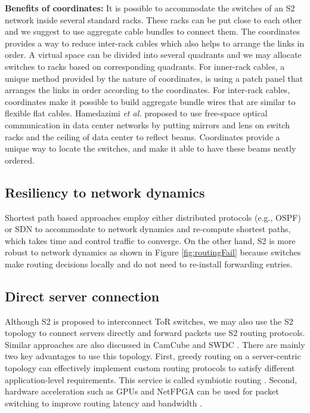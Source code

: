 \documentclass[10pt,conference]{IEEEtran}
\begin{document}
\textbf{Benefits of coordinates:}
It is possible to accommodate the switches of an S2 network inside several standard racks.  These racks can be put close to each other and we suggest to use aggregate cable bundles to connect them.
The coordinates provides a way to reduce inter-rack cables which also helps to arrange the links in order. A virtual space can be divided into several quadrants and we may allocate switches to racks based on corresponding quadrants.
For inner-rack cables, a unique method provided by the nature of coordinates, is using a patch panel that arranges the links in order according to the coordinates. For inter-rack cables, coordinates make it possible to build aggregate bundle wires that are similar to flexible flat cables.
Hamedazimi \emph{et al.} \cite{FireFly2014} proposed to use free-space optical communication in data center networks by putting mirrors and lens on switch racks and the ceiling of data center to reflect beams. Coordinates provide a unique way to locate the switches, and make it able to have these beams neatly ordered.

\subsection{Resiliency to network dynamics}
Shortest path based approaches employ either distributed protocols (e.g., OSPF) or SDN  to accommodate to network dynamics and re-compute shortest paths, which takes time and control traffic to converge.
On the other hand, S2 is more robust to network dynamics as shown in Figure \ref{fig:routingFail} because switches make routing decisions locally and do not need to  re-install forwarding entries.

\subsection{Direct server connection}
Although S2 is proposed to interconnect ToR switches, we may also use the S2 topology to connect servers directly and forward packets use S2 routing protocols. Similar approaches are also discussed in CamCube \cite{Symbiotic} and SWDC \cite{SWDC}. There are mainly two key advantages to use this topology. First, greedy routing on a server-centric topology can effectively implement custom routing protocols to satisfy different application-level requirements. This service is called symbiotic routing  \cite{Symbiotic}. Second,  hardware acceleration such as GPUs and NetFPGA can be used for packet switching to improve routing latency and bandwidth \cite{SWDC}. 
\end{document}
